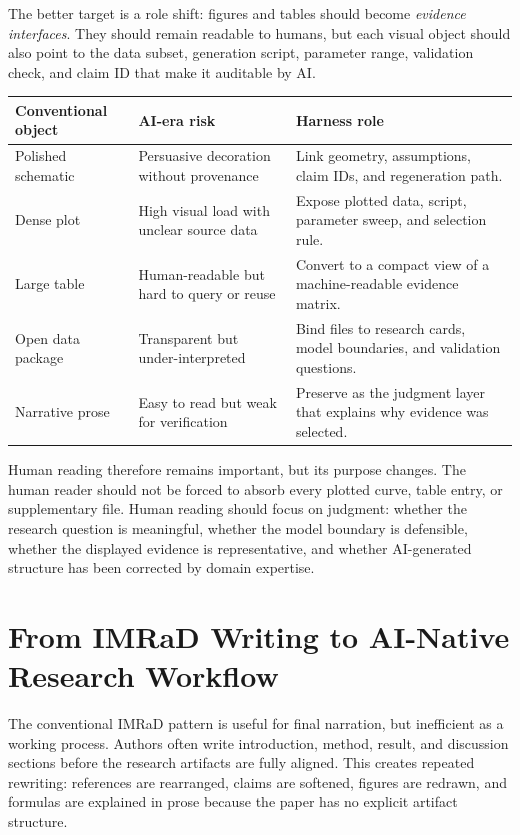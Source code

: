 \documentclass{article}
\begin{document}
The better target is a role shift: figures and tables should become \emph{evidence interfaces}. They should remain readable to humans, but each visual object should also point to the data subset, generation script, parameter range, validation check, and claim ID that make it auditable by AI.

\begin{tcolorbox}[title=Role Shift of Visual Evidence in an AI-Native Paper, colback=white, colframe=gray!60!black]
\small
\setlength{\tabcolsep}{3pt}
\begin{tabular}{p{3.0cm}p{4.2cm}p{5.8cm}}
\toprule
\textbf{Conventional object} & \textbf{AI-era risk} & \textbf{Harness role} \\
\midrule
Polished schematic & Persuasive decoration without provenance & Link geometry, assumptions, claim IDs, and regeneration path. \\
Dense plot & High visual load with unclear source data & Expose plotted data, script, parameter sweep, and selection rule. \\
Large table & Human-readable but hard to query or reuse & Convert to a compact view of a machine-readable evidence matrix. \\
Open data package & Transparent but under-interpreted & Bind files to research cards, model boundaries, and validation questions. \\
Narrative prose & Easy to read but weak for verification & Preserve as the judgment layer that explains why evidence was selected. \\
\bottomrule
\end{tabular}
\end{tcolorbox}

Human reading therefore remains important, but its purpose changes. The human reader should not be forced to absorb every plotted curve, table entry, or supplementary file. Human reading should focus on judgment: whether the research question is meaningful, whether the model boundary is defensible, whether the displayed evidence is representative, and whether AI-generated structure has been corrected by domain expertise.

\section{From IMRaD Writing to AI-Native Research Workflow}

The conventional IMRaD pattern is useful for final narration, but inefficient as a working process. Authors often write introduction, method, result, and discussion sections before the research artifacts are fully aligned. This creates repeated rewriting: references are rearranged, claims are softened, figures are redrawn, and formulas are explained in prose because the paper has no explicit artifact structure.
\end{document}
